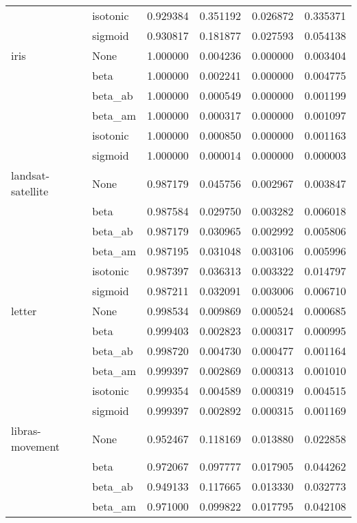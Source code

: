 \begin{tabular}{llrrrr}
        & isotonic &  0.929384 &  0.351192 &  0.026872 &  0.335371 \\
        & sigmoid &  0.930817 &  0.181877 &  0.027593 &  0.054138 \\
iris & None &  1.000000 &  0.004236 &  0.000000 &  0.003404 \\
        & beta &  1.000000 &  0.002241 &  0.000000 &  0.004775 \\
        & beta\_ab &  1.000000 &  0.000549 &  0.000000 &  0.001199 \\
        & beta\_am &  1.000000 &  0.000317 &  0.000000 &  0.001097 \\
        & isotonic &  1.000000 &  0.000850 &  0.000000 &  0.001163 \\
        & sigmoid &  1.000000 &  0.000014 &  0.000000 &  0.000003 \\
landsat-satellite & None &  0.987179 &  0.045756 &  0.002967 &  0.003847 \\
        & beta &  0.987584 &  0.029750 &  0.003282 &  0.006018 \\
        & beta\_ab &  0.987179 &  0.030965 &  0.002992 &  0.005806 \\
        & beta\_am &  0.987195 &  0.031048 &  0.003106 &  0.005996 \\
        & isotonic &  0.987397 &  0.036313 &  0.003322 &  0.014797 \\
        & sigmoid &  0.987211 &  0.032091 &  0.003006 &  0.006710 \\
letter & None &  0.998534 &  0.009869 &  0.000524 &  0.000685 \\
        & beta &  0.999403 &  0.002823 &  0.000317 &  0.000995 \\
        & beta\_ab &  0.998720 &  0.004730 &  0.000477 &  0.001164 \\
        & beta\_am &  0.999397 &  0.002869 &  0.000313 &  0.001010 \\
        & isotonic &  0.999354 &  0.004589 &  0.000319 &  0.004515 \\
        & sigmoid &  0.999397 &  0.002892 &  0.000315 &  0.001169 \\
libras-movement & None &  0.952467 &  0.118169 &  0.013880 &  0.022858 \\
        & beta &  0.972067 &  0.097777 &  0.017905 &  0.044262 \\
        & beta\_ab &  0.949133 &  0.117665 &  0.013330 &  0.032773 \\
        & beta\_am &  0.971000 &  0.099822 &  0.017795 &  0.042108 \\

\end{tabular}
